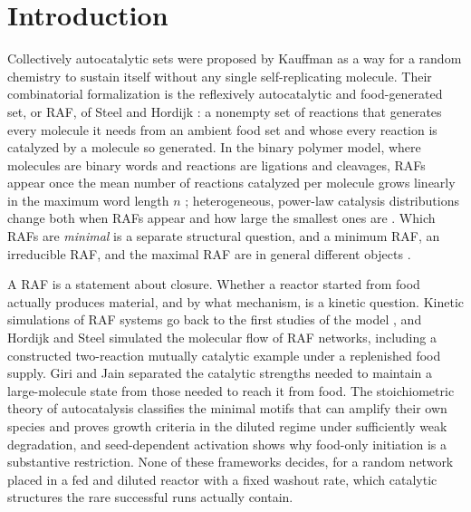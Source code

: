 \documentclass[11pt,letterpaper]{article}
\theoremstyle{plain}
\theoremstyle{definition}
\theoremstyle{remark}
\numberwithin{equation}{section}
\begin{document}
\section{Introduction}\label{sec:intro}

Collectively autocatalytic sets were proposed by Kauffman \cite{kauffman1986autocatalytic} as a way for a random chemistry to sustain itself without any single self-replicating molecule. Their combinatorial formalization is the reflexively autocatalytic and food-generated set, or RAF, of Steel and Hordijk \cite{steel2000emergence,hordijk2004detecting,steel2019autocatalytic}: a nonempty set of reactions that generates every molecule it needs from an ambient food set and whose every reaction is catalyzed by a molecule so generated. In the binary polymer model, where molecules are binary words and reactions are ligations and cleavages, RAFs appear once the mean number of reactions catalyzed per molecule grows linearly in the maximum word length $n$ \cite{mossel2005random,hordijk2011required}; heterogeneous, power-law catalysis distributions change both when RAFs appear and how large the smallest ones are \cite{hordijk2014powerlaw,hordijk2016variable}. Which RAFs are \emph{minimal} is a separate structural question, and a minimum RAF, an irreducible RAF, and the maximal RAF are in general different objects \cite{steel2013minimal,steel2019autocatalytic}.

A RAF is a statement about closure. Whether a reactor started from food actually produces material, and by what mechanism, is a kinetic question. Kinetic simulations of RAF systems go back to the first studies of the model \cite{farmer1986autocatalytic}, and Hordijk and Steel \cite{hordijk2012extended} simulated the molecular flow of RAF networks, including a constructed two-reaction mutually catalytic example under a replenished food supply. Giri and Jain \cite{giri2012origin} separated the catalytic strengths needed to maintain a large-molecule state from those needed to reach it from food. The stoichiometric theory of autocatalysis \cite{blokhuis2020universal,unterberger2022stoechiometric,nandan2026cores} classifies the minimal motifs that can amplify their own species and proves growth criteria in the diluted regime under sufficiently weak degradation, and seed-dependent activation \cite{peng2022hierarchical} shows why food-only initiation is a substantive restriction. None of these frameworks decides, for a random network placed in a fed and diluted reactor with a fixed washout rate, which catalytic structures the rare successful runs actually contain.
\end{document}
